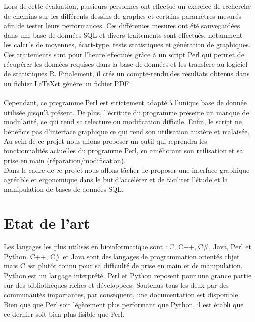 \documentclass[a4paper]{report}
\begin{document}
Lors de cette évaluation, plusieurs personnes ont effectué un exercice de recherche de chemins sur les différents dessins de graphes et certains paramètres mesurés afin de tester leurs performances.
 Ces différentes mesures ont été sauvegardées dans une base de données SQL et divers traitements sont effectués, notamment les calculs de moyennes, écart-type, tests statistiques et génération de graphiques.
 Ces traitements sont pour l’heure effectués grâce à un script Perl qui permet de récupérer les données requises dans la base de données et les transfère au logiciel de statistiques R.
 Finalement, il crée un compte-rendu des résultats obtenus dans un fichier \LaTeX et génère un fichier PDF.\\
 \\

Cependant, ce programme Perl est strictement adapté à l'unique base de donnée utilisée jusqu'à présent.
De plus, l'écriture du programme présente un manque de modularité, ce qui rend sa relecture ou modification difficile. 
Enfin, le script ne bénéficie pas d'interface graphique ce qui rend son utilisation austère et malaisée.\\

Au sein de ce projet nous allons proposer un outil qui reprendra les fonctionnalités actuelles du programme Perl, en améliorant son utilisation et sa prise en main (réparation/modification).\\

Dans le cadre de ce projet nous allons tâcher de proposer une interface graphique agréable et ergonomique dans le but d'accélérer et de faciliter l'étude et la manipulation de bases de données SQL.


\section{Etat de l'art}

Les langages les plus utilisés en bioinformatique\cite{ref3} sont : C, C++, C\#, Java, Perl et Python. C++, C\# et Java sont des langages de programmation orientés objet mais C est plutôt connu pour sa difficulté de prise en main et de manipulation.\\

Python\cite{refpyt} est un langage interprété. Perl\cite{refperl} et Python reposent pour une grande partie sur des bibliothèques riches et développées. Soutenus tous les deux par des communautés importantes, par conséquent, une documentation est disponible.\\
Bien que que Perl soit légèrement plus performant que Python\cite{ref5}, il est établi que ce dernier soit bien plus lisible que Perl.
\end{document}
